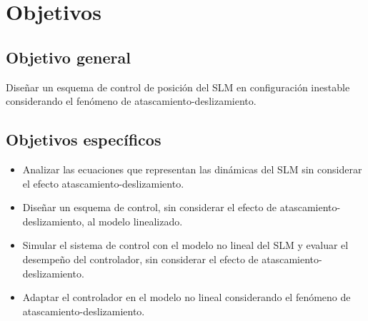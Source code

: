 \chapter{Objetivos}

\section{Objetivo general}
Diseñar un esquema de control de posición del SLM en configuración inestable considerando el fenómeno de atascamiento-deslizamiento.

\section{Objetivos espec\'ificos}
\begin{itemize}
	\item Analizar las ecuaciones que representan las dinámicas del SLM sin considerar el efecto atascamiento-deslizamiento. 
	\item Diseñar un esquema de control, sin considerar el efecto de atascamiento-deslizamiento, al modelo linealizado.
    \item Simular el sistema de control con el modelo no lineal del SLM y evaluar el desempeño del  controlador, sin considerar el efecto de atascamiento-deslizamiento.
	\item Adaptar el controlador en el modelo no lineal considerando el fenómeno de atascamiento-deslizamiento.
\end{itemize}